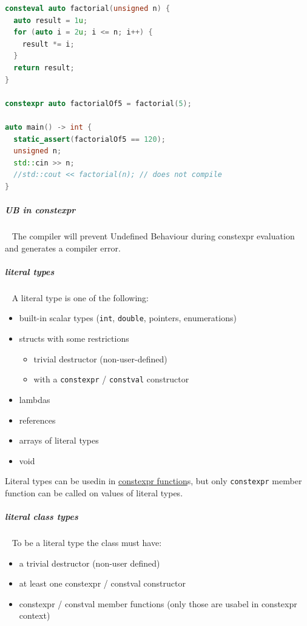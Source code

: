 \documentclass[11pt,twoside,landscape]{article}
\begin{document}
\begin{multicols}{2}
\begin{lstlisting}[language=c++,label=lst:consteval-example,caption={consteval example},captionpos=b,numbers=none]
consteval auto factorial(unsigned n) {
  auto result = 1u;
  for (auto i = 2u; i <= n; i++) {
    result *= i;
  }
  return result;
}

constexpr auto factorialOf5 = factorial(5);

auto main() -> int {
  static_assert(factorialOf5 == 120);
  unsigned n;
  std::cin >> n;
  //std::cout << factorial(n); // does not compile
}
\end{lstlisting}

\subparagraph{UB in constexpr} \
\label{sec:orgb938436}
The compiler will prevent Undefined Behaviour during constexpr evaluation and generates a compiler error.

\subparagraph{literal types} \
\label{sec:orgd11ad16}
A literal type is one of the following:
\begin{itemize}
\item built-in scalar types (\texttt{int}, \texttt{double}, pointers, enumerations)
\item structs with some restrictions
\begin{itemize}
\item trivial destructor (non-user-defined)
\item with a \texttt{constexpr} / \texttt{constval} constructor
\end{itemize}
\item lambdas
\item references
\item arrays of literal types
\item void
\end{itemize}


Literal types can be usedin in \href{../../../roam/20230629095751-what_are_constexpr_functions_in_cpp.org}{constexpr function}s, but only \texttt{constexpr} member function can be called on values of literal types.

\subparagraph{literal class types} \
\label{sec:orge596f6d}
To be a literal type the class must have:
\begin{itemize}
\item a trivial destructor (non-user defined)
\item at least one constexpr / constval constructor
\item constexpr / constval member functions (only those are usabel in constexpr context)
\end{itemize}



\end{multicols}
\end{document}
